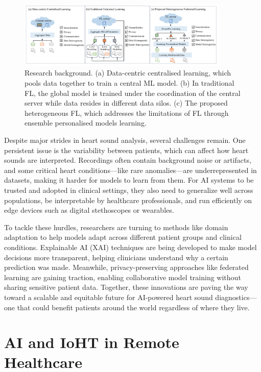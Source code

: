 \begin{figure}[htbp]
    \centering
    \includegraphics [width=0.9\textwidth]{./Figures/fig.png}
    \caption{Research background. (a) Data-centric centralised learning, which pools data together to train a central ML model. (b) In traditional FL, the global model is trained under the coordination of the central server while data resides in different data silos. (c) The proposed heterogeneous FL, which addresses the limitations of FL through ensemble personalised models learning. 
}
    \label{fig:enter-label}
\end{figure}


Despite major strides in heart sound analysis, several challenges remain. One persistent issue is the variability between patients, which can affect how heart sounds are interpreted. Recordings often contain background noise or artifacts, and some critical heart conditions—like rare anomalies—are underrepresented in datasets, making it harder for models to learn from them. For AI systems to be trusted and adopted in clinical settings, they also need to generalize well across populations, be interpretable by healthcare professionals, and run efficiently on edge devices such as digital stethoscopes or wearables.

To tackle these hurdles, researchers are turning to methods like domain adaptation to help models adapt across different patient groups and clinical conditions. Explainable AI (XAI) techniques are being developed to make model decisions more transparent, helping clinicians understand why a certain prediction was made. Meanwhile, privacy-preserving approaches like federated learning are gaining traction, enabling collaborative model training without sharing sensitive patient data. Together, these innovations are paving the way toward a scalable and equitable future for AI-powered heart sound diagnostics—one that could benefit patients around the world regardless of where they live.

\section{AI and IoHT in Remote Healthcare}

